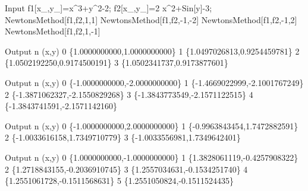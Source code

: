 \documentclass[10pt,twoside,openany]{memoir}
\begin{document}
\begin{mdframed}
\begin{solution}
\begin{mmaCell}[moredefined={NewtonsMethod, f1, f2, \
table},morepattern={f1_, f2_, x0_, y0_, tol_, maxIter_, maxIter, x_, \
y_, x0, y0, tol},morelocal={xVals,
yVals, delta, n, F, J, sol}]{Input}
f1[x_,y_]=x^3+y^2-2;
f2[x_,y_]=2 x^2+Sin[y]-3;
NewtonsMethod[f1,f2,1,1]
NewtonsMethod[f1,f2,-1,-2]
NewtonsMethod[f1,f2,-1,2]
NewtonsMethod[f1,f2,1,-1]
\end{mmaCell}

\newpage
\begin{mmaCell}[addtoindex=-267,form=TableForm]{Output}
n	(x,y)
0	\{1.0000000000,1.0000000000\}
1	\{1.0497026813,0.9254459781\}
2	\{1.0502192250,0.9174500191\}
3	\{1.0502341737,0.9173877601\}
\end{mmaCell}

\begin{mmaCell}[form=TableForm]{Output}
n	(x,y)
0	\{-1.0000000000,-2.0000000000\}
1	\{-1.4669022999,-2.1001767249\}
2	\{-1.3871062327,-2.1550829268\}
3	\{-1.3843773549,-2.1571122515\}
4	\{-1.3843741591,-2.1571142160\}
\end{mmaCell}

\begin{mmaCell}[form=TableForm]{Output}
n	(x,y)
0	\{-1.0000000000,2.0000000000\}
1	\{-0.9963843454,1.7472882591\}
2	\{-1.0033616158,1.7349710779\}
3	\{-1.0033556981,1.7349642401\}
\end{mmaCell}

\begin{mmaCell}[form=TableForm]{Output}
n	(x,y)
0	\{1.0000000000,-1.0000000000\}
1	\{1.3828061119,-0.4257908322\}
2	\{1.2718843155,-0.2036910745\}
3	\{1.2557034631,-0.1534251740\}
4	\{1.2551061728,-0.1511568631\}
5	\{1.2551050824,-0.1511524435\}
\end{mmaCell}
        \end{solution}
        \end{mdframed}
\end{document}
